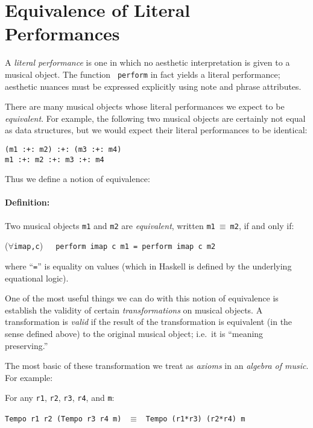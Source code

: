 \section{Equivalence of Literal Performances}
\label{equivalence}

A {\em literal performance} is one in which no aesthetic
interpretation is given to a musical object.  The function {\tt
perform} in fact yields a literal performance; aesthetic nuances must
be expressed explicitly using note and phrase attributes.

There are many musical objects whose literal performances we expect to
be {\em equivalent}.  For example, the following two musical objects
are certainly not equal as data structures, but we would expect their
literal performances to be identical:
\begin{center}
{\tt (m1 :+: m2) :+: (m3 :+: m4)} \\
{\tt m1 :+: m2 :+: m3 :+: m4}
\end{center}
Thus we define a notion of equivalence:

\paragraph{Definition:}
Two musical objects {\tt m1} and {\tt m2} are {\em equivalent}, written
\verb|m1|$\ \equiv\ $\verb|m2|, if and only if:
\begin{center}
($\forall$\verb|imap,c|)\ \ \ {\tt perform imap c m1 = perform imap c m2}
\end{center}
where ``\verb|=|'' is equality on values (which in Haskell is defined
by the underlying equational logic).

One of the most useful things we can do with this notion of
equivalence is establish the validity of certain {\em transformations}
on musical objects.  A transformation is {\em valid} if the result of
the transformation is equivalent (in the sense defined above) to the
original musical object; i.e.~it is ``meaning preserving.''  

The most basic of these transformation we treat as {\em axioms} in an
{\em algebra of music}.  For example:

\begin{axiom}
For any {\tt r1}, {\tt r2}, {\tt r3}, {\tt r4}, and {\tt m}:
\begin{center}
{\tt Tempo r1 r2 (Tempo r3 r4 m)} $\ \ \equiv\ \ $ {\tt Tempo (r1*r3) (r2*r4) m}
\end{center}
\end{axiom}

